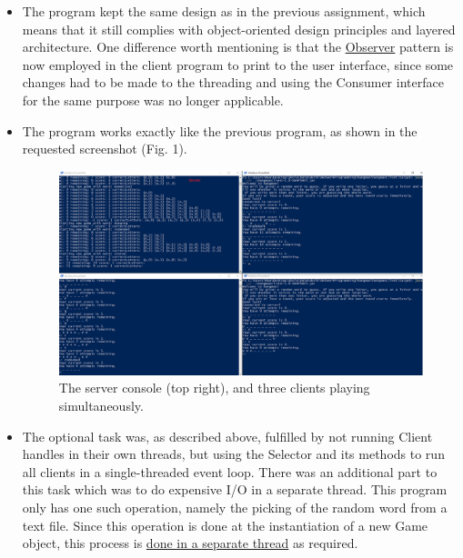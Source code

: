 \documentclass[a4paper]{scrartcl}
\begin{document}
\begin{itemize}
	\item The program kept the same design as in the previous assignment, which means that it still complies with object-oriented design principles and layered architecture. One difference worth mentioning is that the \href{https://github.com/fongie/Hangman/blob/nonblocking/hangmanclient/src/main/java/view/UserInterface.java#L56}{Observer} pattern is now employed in the client program to print to the user interface, since some changes had to be made to the threading and using the Consumer interface for the same purpose was no longer applicable.
	
	\item The program works exactly like the previous program, as shown in the requested screenshot (Fig. 1).
	
	\begin{figure}[h!]
  \begin{center}
    \includegraphics[scale=0.35]{game.png}
    \caption{The server console (top right), and three clients playing simultaneously.}
    \label{fig:game}
  \end{center}
\end{figure}
	
	\item The optional task was, as described above, fulfilled by not running Client handles in their own threads, but using the Selector and its methods to run all clients in a single-threaded event loop. There was an additional part to this task which was to do expensive I/O in a separate thread. This program only has one such operation, namely the picking of the random word from a text file. Since this operation is done at the instantiation of a new Game object, this process is \href{https://github.com/fongie/Hangman/blob/nonblocking/hangmanserver/src/main/java/net/Client.java#L67}{done in a separate thread} as required.
	
\end{itemize}
\end{document}
